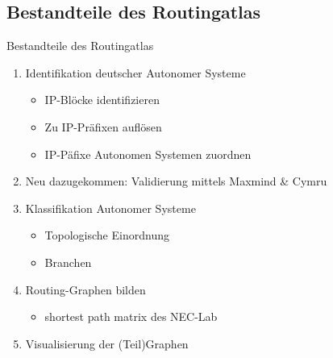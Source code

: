 \documentclass[ngerman,compress,hyperref={bookmarks}]{beamer}
\begin{document}
\subsection{Bestandteile des Routingatlas}
\begin{frame}{Bestandteile des Routingatlas}
\begin{enumerate}
 \item Identifikation deutscher Autonomer Systeme
 \begin {itemize}
  \item IP-Blöcke identifizieren
  \item Zu IP-Präfixen auflösen
  \item IP-Päfixe Autonomen Systemen zuordnen
 \end{itemize}
 \item Neu dazugekommen: Validierung mittels Maxmind \& Cymru
 \item Klassifikation Autonomer Systeme
 \begin{itemize}
  \item Topologische Einordnung
  \item Branchen
 \end{itemize}
 \item Routing-Graphen bilden
 \begin{itemize}
  \item shortest path matrix des NEC-Lab
 \end{itemize}
 \item Visualisierung der (Teil)Graphen
\end{enumerate}
\end{frame}
\end{document}
